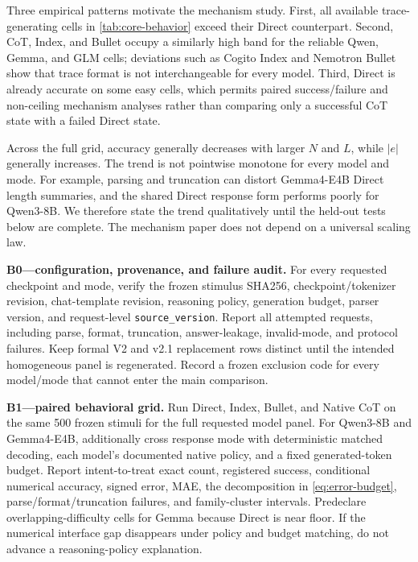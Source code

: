 Three empirical patterns motivate the mechanism study. First, all available trace-generating cells in \cref{tab:core-behavior} exceed their Direct counterpart. Second, CoT, Index, and Bullet occupy a similarly high band for the reliable Qwen, Gemma, and GLM cells; deviations such as Cogito Index and Nemotron Bullet show that trace format is not interchangeable for every model. Third, Direct is already accurate on some easy cells, which permits paired success/failure and non-ceiling mechanism analyses rather than comparing only a successful CoT state with a failed Direct state.

Across the full grid, accuracy generally decreases with larger \(N\) and \(L\), while \(|e|\) generally increases. The trend is not pointwise monotone for every model and mode. For example, parsing and truncation can distort Gemma4-E4B Direct length summaries, and the shared Direct response form performs poorly for Qwen3-8B. We therefore state the trend qualitatively until the held-out tests below are complete. The mechanism paper does not depend on a universal scaling law.

\begin{todobox}
\textbf{B0---configuration, provenance, and failure audit.}
For every requested checkpoint and mode, verify the frozen stimulus SHA256,
checkpoint/tokenizer revision, chat-template revision, reasoning policy,
generation budget, parser version, and request-level
\texttt{source\_version}. Report all attempted requests, including parse,
format, truncation, answer-leakage, invalid-mode, and protocol failures. Keep
formal V2 and v2.1 replacement rows distinct until the intended homogeneous
panel is regenerated. Record a frozen exclusion code for every model/mode
that cannot enter the main comparison.
\end{todobox}

\begin{todobox}
\textbf{B1---paired behavioral grid.}
Run Direct, Index, Bullet, and Native CoT on the same 500 frozen stimuli for
the full requested model panel. For Qwen3-8B and Gemma4-E4B, additionally
cross response mode with deterministic matched decoding, each model's
documented native policy, and a fixed generated-token budget. Report
intent-to-treat exact count, registered success, conditional numerical
accuracy, signed error, MAE, the decomposition in \cref{eq:error-budget},
parse/format/truncation failures, and family-cluster intervals. Predeclare
overlapping-difficulty cells for Gemma because Direct is near floor. If the
numerical interface gap disappears under policy and budget matching, do not
advance a reasoning-policy explanation.
\end{todobox}

